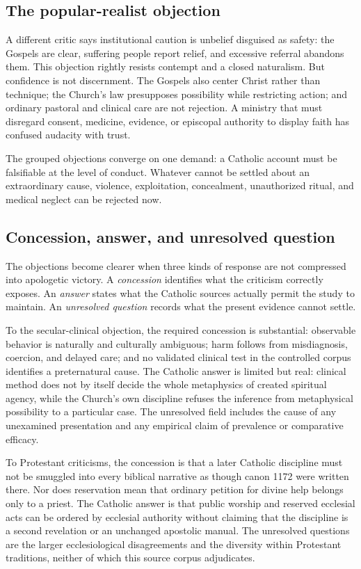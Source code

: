 \subsection{The popular-realist objection}

A different critic says institutional caution is unbelief disguised as safety:
the Gospels are clear, suffering people report relief, and excessive referral
abandons them. This objection rightly resists contempt and a closed naturalism.
But confidence is not discernment. The Gospels also center Christ rather than
technique; the Church's law presupposes possibility while restricting action;
and ordinary pastoral and clinical care are not rejection. A ministry that
must disregard consent, medicine, evidence, or episcopal authority to display
faith has confused audacity with trust.

The grouped objections converge on one demand: a Catholic account must be
falsifiable at the level of conduct. Whatever cannot be settled about an
extraordinary cause, violence, exploitation, concealment, unauthorized ritual,
and medical neglect can be rejected now.

\subsection{Concession, answer, and unresolved question}

The objections become clearer when three kinds of response are not compressed
into apologetic victory. A \emph{concession} identifies what the criticism
correctly exposes. An \emph{answer} states what the Catholic sources actually
permit the study to maintain. An \emph{unresolved question} records what the
present evidence cannot settle.

To the secular-clinical objection, the required concession is substantial:
observable behavior is naturally and culturally ambiguous; harm follows from
misdiagnosis, coercion, and delayed care; and no validated clinical test in the
controlled corpus identifies a preternatural cause. The Catholic answer is
limited but real:
clinical method does not by itself decide the whole metaphysics of created
spiritual agency, while the Church's own discipline refuses the inference from
metaphysical possibility to a particular case. The unresolved field includes
the cause of any unexamined presentation and any empirical claim of prevalence
or comparative efficacy.

To Protestant criticisms, the concession is that a later Catholic discipline
must not be smuggled into every biblical narrative as though canon 1172 were
written there. Nor does reservation mean that ordinary petition for divine
help belongs only to a priest. The Catholic answer is that public worship and
reserved ecclesial acts can be ordered by ecclesial authority without claiming
that the discipline is a second revelation or an unchanged apostolic manual.
The unresolved questions are the larger ecclesiological disagreements and the
diversity within Protestant traditions, neither of which this source corpus
adjudicates.

